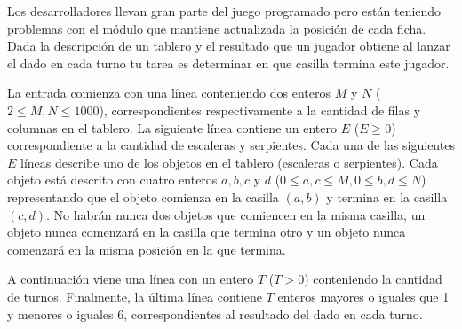 \documentclass{oci}
\begin{document}
\begin{problemDescription}
  \begin{figure}
    \centering
    \begin{subfigure}{0.45\textwidth}
      \centering
    \end{subfigure}
    \begin{subfigure}{0.45\textwidth}
      \centering
    \end{subfigure}
  \end{figure}

  Los desarrolladores llevan gran parte del juego programado pero están teniendo
  problemas con el módulo que mantiene actualizada la posición de cada ficha.
  Dada la descripción de un tablero y el resultado que un jugador obtiene al
  lanzar el dado en cada turno tu tarea es determinar en que casilla termina
  este jugador.
\end{problemDescription}

\begin{inputDescription}
  La entrada comienza con una línea conteniendo dos enteros $M$ y $N$ ($2 \leq
  M, N \leq 1000$), correspondientes respectivamente a la cantidad de filas y
  columnas en el tablero.
  La siguiente línea contiene un entero $E$ ($E \geq 0$) correspondiente a la
  cantidad de escaleras y serpientes.
  Cada una de las siguientes $E$ líneas describe uno de los objetos en el
  tablero (escaleras o serpientes).
  Cada objeto está descrito con cuatro enteros $a, b, c$ y $d$ ($0 \leq a, c
  \leq M, 0 \leq b, d \leq N$)
  representando que el objeto comienza en la casilla $(a, b)$ y termina en la
  casilla $(c, d)$.
  No habrán nunca dos objetos que comiencen en la misma casilla, un objeto
  nunca comenzará en la casilla que termina otro y un objeto nunca comenzará en
  la misma posición en la que termina.

  A continuación viene una línea con un entero $T$ ($T > 0$) conteniendo la
  cantidad de turnos.
  Finalmente, la última línea contiene $T$ enteros mayores o iguales que 1 y
  menores o iguales 6, correspondientes al resultado del dado en cada turno.
\end{inputDescription}
\end{document}

